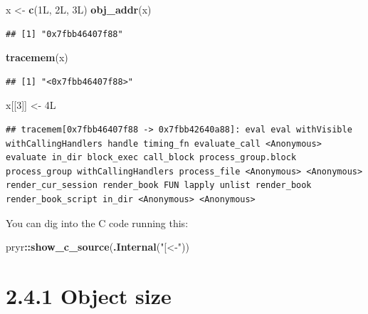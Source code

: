 \documentclass[]{book}
\newenvironment{Shaded}{\begin{snugshade}}{\end{snugshade}}
\newcommand{\DecValTok}[1]{\textcolor[rgb]{0.00,0.00,0.81}{#1}}
\newcommand{\KeywordTok}[1]{\textcolor[rgb]{0.13,0.29,0.53}{\textbf{#1}}}
\newcommand{\NormalTok}[1]{#1}
\newcommand{\OperatorTok}[1]{\textcolor[rgb]{0.81,0.36,0.00}{\textbf{#1}}}
\newcommand{\StringTok}[1]{\textcolor[rgb]{0.31,0.60,0.02}{#1}}
\begin{document}
\begin{Shaded}
\begin{Highlighting}[]
\NormalTok{x <-}\StringTok{ }\KeywordTok{c}\NormalTok{(1L, 2L, 3L)}
\KeywordTok{obj_addr}\NormalTok{(x)}
\end{Highlighting}
\end{Shaded}

\begin{verbatim}
## [1] "0x7fbb46407f88"
\end{verbatim}

\begin{Shaded}
\begin{Highlighting}[]
\KeywordTok{tracemem}\NormalTok{(x)}
\end{Highlighting}
\end{Shaded}

\begin{verbatim}
## [1] "<0x7fbb46407f88>"
\end{verbatim}

\begin{Shaded}
\begin{Highlighting}[]
\NormalTok{x[[}\DecValTok{3}\NormalTok{]] <-}\StringTok{ }\NormalTok{4L}
\end{Highlighting}
\end{Shaded}

\begin{verbatim}
## tracemem[0x7fbb46407f88 -> 0x7fbb42640a88]: eval eval withVisible withCallingHandlers handle timing_fn evaluate_call <Anonymous> evaluate in_dir block_exec call_block process_group.block process_group withCallingHandlers process_file <Anonymous> <Anonymous> render_cur_session render_book FUN lapply unlist render_book render_book_script in_dir <Anonymous> <Anonymous>
\end{verbatim}

You can dig into the C code running this:

\begin{Shaded}
\begin{Highlighting}[]
\NormalTok{pryr}\OperatorTok{::}\KeywordTok{show_c_source}\NormalTok{(}\KeywordTok{.Internal}\NormalTok{(}\StringTok{"[<-"}\NormalTok{))}
\end{Highlighting}
\end{Shaded}

\hypertarget{object-size}{%
\section*{2.4.1 Object size}\label{object-size}}
\end{document}
